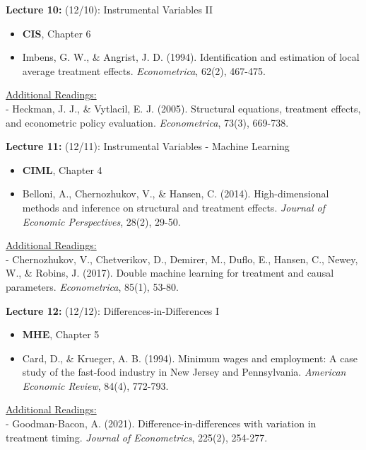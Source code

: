 \documentclass[12pt]{article}
\begin{document}
\vspace{2em}
\noindent\textbf{Lecture 10:} (12/10): Instrumental Variables II \\
\vspace{1em}
\begin{itemize}
    \item \textbf{CIS}, Chapter 6
    \item Imbens, G. W., \& Angrist, J. D. (1994). Identification and estimation of local average treatment effects. \textit{Econometrica}, 62(2), 467-475.
\end{itemize}
\vspace{1em}
\underline{Additional Readings:} \\
\hspace{1em} - Heckman, J. J., \& Vytlacil, E. J. (2005). Structural equations, treatment effects, and econometric policy evaluation. \textit{Econometrica}, 73(3), 669-738.

\vspace{2em}
\noindent\textbf{Lecture 11:} (12/11): Instrumental Variables - Machine Learning \\
\vspace{1em}
\begin{itemize}
    \item \textbf{CIML}, Chapter 4
    \item Belloni, A., Chernozhukov, V., \& Hansen, C. (2014). High-dimensional methods and inference on structural and treatment effects. \textit{Journal of Economic Perspectives}, 28(2), 29-50.
\end{itemize}
\vspace{1em}
\underline{Additional Readings:} \\
\hspace{1em} - Chernozhukov, V., Chetverikov, D., Demirer, M., Duflo, E., Hansen, C., Newey, W., \& Robins, J. (2017). Double machine learning for treatment and causal parameters. \textit{Econometrica}, 85(1), 53-80.

\vspace{2em}
\noindent\textbf{Lecture 12:} (12/12): Differences-in-Differences I \\
\vspace{1em}
\begin{itemize}
    \item \textbf{MHE}, Chapter 5
    \item Card, D., \& Krueger, A. B. (1994). Minimum wages and employment: A case study of the fast-food industry in New Jersey and Pennsylvania. \textit{American Economic Review}, 84(4), 772-793.
\end{itemize}
\vspace{1em}
\underline{Additional Readings:} \\
\hspace{1em} - Goodman-Bacon, A. (2021). Difference-in-differences with variation in treatment timing. \textit{Journal of Econometrics}, 225(2), 254-277.
\end{document}
